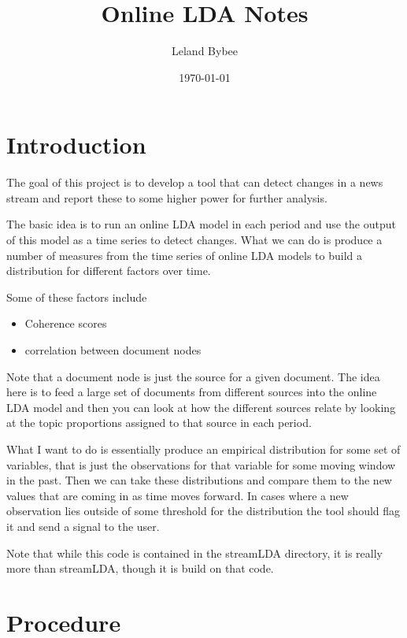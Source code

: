 \documentclass[a4paper]{article}
\title{Online LDA Notes}
\author{Leland Bybee}
\date{\today}
\begin{document}
\maketitle

\section{Introduction}

The goal of this project is to develop a tool that can detect changes in a news stream and report these to some higher power for further analysis.

The basic idea is to run an online LDA model in each period and use the output of this model as a time series to detect changes.  What we can do is produce a number of measures from the time series of online LDA models to build a distribution for different factors over time.  

Some of these factors include

\begin{itemize}
\item Coherence scores
\item correlation between document nodes
\end{itemize}

Note that a document node is just the source for a given document.  The idea here is to feed a large set of documents from different sources into the online LDA model and then you can look at how the different sources relate by looking at the topic proportions assigned to that source in each period.

What I want to do is essentially produce an empirical distribution for some set of variables, that is just the observations for that variable for some moving window in the past.  Then we can take these distributions and compare them to the new values that are coming in as time moves forward.  In cases where a new observation lies outside of some threshold for the distribution the tool should flag it and send a signal to the user.

Note that while this code is contained in the streamLDA directory, it is really more than streamLDA, though it is build on that code.

\section{Procedure}
\end{document}
